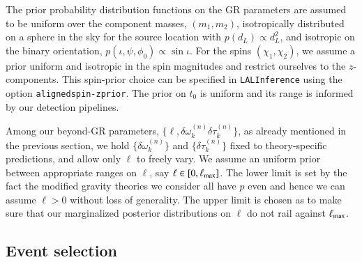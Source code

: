 \documentclass[twocolumn,
               prd,
               aps,
               superscriptaddress,
               tightenlines,
               nofootinbib,
               eqsecnum,
               amsfonts,
               amsmath,
               longbibliography]{revtex4-1}
\begin{document}
The prior probability distribution functions on the GR parameters are assumed to be uniform over the component masses, $(m_1, m_2)$, isotropically distributed on a sphere in the sky for the source location with $p(d_L) \propto d_L^2$, and isotropic on the binary orientation, $p(\iota, \psi, \phi_0) \propto \sin\iota$. For the spins $(\chi_1, \chi_2)$, we assume a prior uniform and isotropic in the spin magnitudes and restrict ourselves to the $z$-components.
This spin-prior choice can be specified in \texttt{LALInference} using the option \texttt{alignedspin-zprior}.
%
The prior on $t_0$ is uniform and its range is informed by our detection pipelines.

Among our beyond-GR parameters, $\{\ell, \delta \omega_k^{(n)}\delta \tau_k^{(n)}\}$,
as already mentioned in the previous section, we hold $\{\delta \omega_k^{(n)}\}$
and $\{\delta \tau_k^{(n)}\}$ fixed to theory-specific predictions, and allow only $\ell$ to freely vary.
%
We assume an uniform prior between appropriate ranges on $\ell$,
say $\ell \in [0, \ell_{\rm max}]$.
%
The lower limit is set by the fact the modified gravity theories we consider
all have $p$ even and hence we can assume $\ell > 0$ without loss of
generality.
%
The upper limit is chosen as to make sure that our marginalized posterior
distributions on $\ell$ do not rail against $\ell_{\rm max}$.


\subsection{Event selection}
\end{document}
